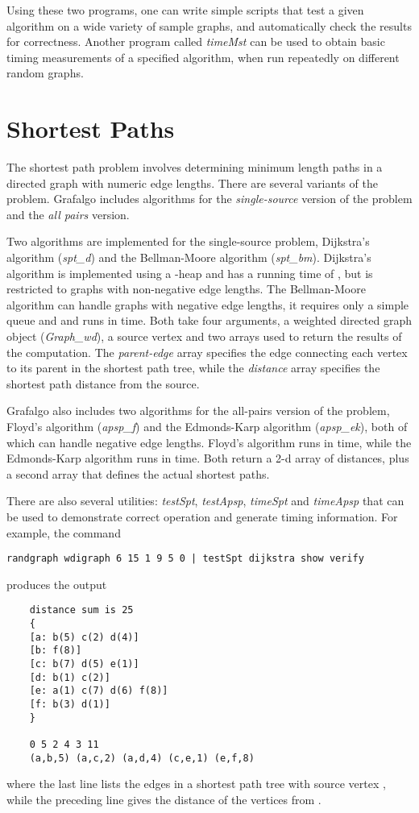 \documentclass[11pt]{article}
\begin{document}
Using these two programs, one can write simple scripts that
test a given algorithm on a wide variety of sample graphs, and automatically check the results for
correctness. Another program called {\sl timeMst} can be used to obtain basic timing measurements
of a specified algorithm, when run repeatedly on different random graphs.

\section{Shortest Paths}

The shortest path problem involves determining minimum length paths in a directed graph
with numeric edge lengths. There are several variants of the problem. Grafalgo includes
algorithms for the {\sl single-source} version of the problem and the {\sl all pairs} version.

Two algorithms are implemented for the single-source problem, Dijkstra's algorithm ({\sl spt\_d})
and the Bellman-Moore algorithm ({\sl spt\_bm}).
Dijkstra's algorithm is implemented using a -heap and has a running time of 
, but is restricted to graphs with non-negative edge lengths. 
The Bellman-Moore algorithm can handle graphs with negative edge lengths,
it requires only a simple queue and and runs in   time.
Both take four arguments, a weighted directed graph object ({\sl Graph\_wd}), a source vertex
and two arrays used to return the results of the computation.
The {\sl parent-edge} array specifies the edge connecting each vertex to its parent in the 
shortest path tree,
while the {\sl distance} array specifies the shortest path distance from the source.

Grafalgo also includes two algorithms for the all-pairs version of the problem,
Floyd's algorithm ({\sl apsp\_f}) and the Edmonds-Karp algorithm ({\sl apsp\_ek}),
both of which can handle negative edge lengths.
Floyd's algorithm runs in  time, 
while the Edmonds-Karp algorithm runs
in  time.
Both return a 2-d array of distances, 
plus a second array that defines the actual shortest paths.

There are also several utilities: {\sl testSpt}, {\sl testApsp}, {\sl timeSpt} and {\sl timeApsp}
that can be used to demonstrate correct operation and generate timing information.
For example, the command
\begin{verbatim}
randgraph wdigraph 6 15 1 9 5 0 | testSpt dijkstra show verify
\end{verbatim}
produces the output
\begin{verbatim}
    distance sum is 25
    {
    [a: b(5) c(2) d(4)]
    [b: f(8)]
    [c: b(7) d(5) e(1)]
    [d: b(1) c(2)]
    [e: a(1) c(7) d(6) f(8)]
    [f: b(3) d(1)]
    }

    0 5 2 4 3 11 
    (a,b,5) (a,c,2) (a,d,4) (c,e,1) (e,f,8)
\end{verbatim}
where the last line lists the edges in a shortest path tree with source vertex ,
while the preceding line gives the distance of the vertices from .
\end{document}
